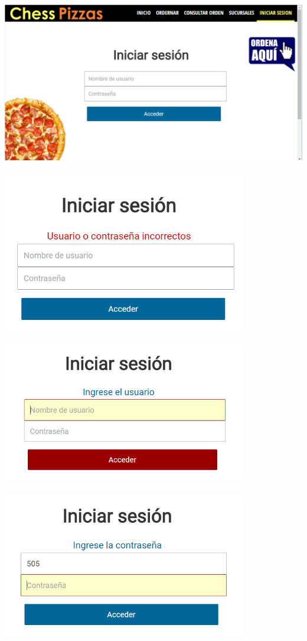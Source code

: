 \documentclass[]{article}
\begin{document}
\begin{center}
	\includegraphics[width=\textwidth]{iniciar_sesion}\\
	\ \\
	\includegraphics[width=0.8\textwidth]{iniciar_sesion2a}\\
	\ \\
	\includegraphics[width=0.8\textwidth]{iniciar_sesion2b}\\
	\ \\
	\includegraphics[width=0.8\textwidth]{iniciar_sesion2c}
\end{center}
\end{document}
